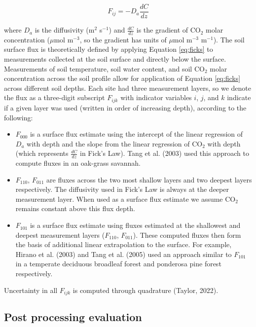 \documentclass[
  letterpaper,
  DIV=11,
  numbers=noendperiod]{scrartcl}
\providecommand{\tightlist}{%
  \setlength{\itemsep}{0pt}\setlength{\parskip}{0pt}}
\begin{document}
\begin{equation}
  F_{ij} = -D_{a} \frac{dC}{dz}
  \label{eq:ficks}
\end{equation}

where \(D_{a}\) is the diffusivity (m\(^{2}\) s\(^{-1}\)) and
\(\frac{dC}{dz}\) is the gradient of CO\(_{2}\) molar concentration
(\(\mu\)mol m\(^{-3}\), so the gradient has units of \(\mu\)mol
m\(^{-3}\) m\(^{-1}\)). The soil surface flux is theoretically defined
by applying Equation \ref{eq:ficks} to measurements collected at the
soil surface and directly below the surface. Measurements of soil
temperature, soil water content, and soil CO\(_{2}\) molar concentration
across the soil profile allow for application of Equation \ref{eq:ficks}
across different soil depths. Each site had three measurement layers, so
we denote the flux as a three-digit subscript \(F_{ijk}\) with indicator
variables \(i\), \(j\), and \(k\) indicate if a given layer was used
(written in order of increasing depth), according to the following:

\begin{itemize}
\tightlist
\item
  \(F_{000}\) is a surface flux estimate using the intercept of the
  linear regression of \(D_{a}\) with depth and the slope from the
  linear regression of CO\(_{2}\) with depth (which represents
  \(\displaystyle \frac{dC}{dz}\) in Fick's Law). Tang et al. (2003)
  used this approach to compute fluxes in an oak-grass savannah.
\item
  \(F_{110}\), \(F_{011}\) are fluxes across the two most shallow layers
  and two deepest layers respectively. The diffusivity used in Fick's
  Law is always at the deeper measurement layer. When used as a surface
  flux estimate we assume CO\(_{2}\) remains constant above this flux
  depth.
\item
  \(F_{101}\) is a surface flux estimate using fluxes estimated at the
  shallowest and deepest measurement layers (\(F_{110}\), \(F_{011}\)).
  These computed fluxes then form the basis of additional linear
  extrapolation to the surface. For example, Hirano et al. (2003) and
  Tang et al. (2005) used an approach similar to \(F_{101}\) in a
  temperate deciduous broadleaf forest and ponderosa pine forest
  respectively.
\end{itemize}

Uncertainty in all \(F_{ijk}\) is computed through quadrature (Taylor,
2022).

\subsection{Post processing evaluation}\label{sec-post-process}
\end{document}
